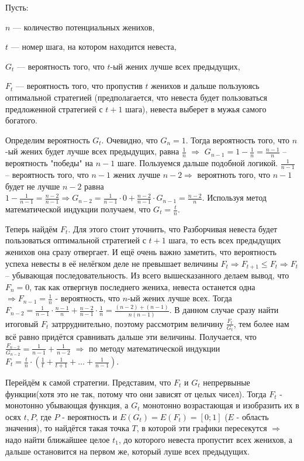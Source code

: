 \documentclass[12pt]{article}
\newcounter{problem}[section]
\newenvironment{problem}%
{%
\refstepcounter{problem}%
     \hypertarget{problem:{\thesection.\theproblem}}{} %
     \Writetofile{solution_file}{\protect\hypertarget{soln:\thesection.\theproblem}{}}
     \begin{myenum}[label=\bfseries\protect\hyperlink{soln:\thesection.\theproblem}{\thesection.\theproblem},ref=\thesection.\theproblem]
     \item%
    }%
    {%
    \end{myenum}}
\begin{document}
\begin{problem}
\begin{sol}
Пусть:

$n$ — количество потенциальных женихов,

$t$ — номер шага, на котором находится невеста,

$G_t$ — вероятность того, что $t$-ый жених лучше всех предыдущих,

$F_t$ — вероятность того, что пропустив $t$ женихов и дальше пользуюясь оптимальной
стратегией (предполагается, что невеста будет пользоваться предложенной стратегией с $t+1$
шага), невеста выберет в мужья самого богатого.

Определим вероятность $G_t$. Очевидно, что $G_n = 1$. Тогда вероятность того, что $n$-ый жених будет лучше всех предыдущих, равна  $\frac{1}{n}$ $\Rightarrow$ $G_{n-1}=1-\frac{1}{n}=\frac{n-1}{n}$ – вероятность "победы" на $n-1$ шаге. Пользуемся дальше подобной логикой. $\frac{1}{n-1}$ – вероятность того, что $n-1$ жених лучше $n-2\Rightarrow$ вероятноть того, что $n-1$ будет не лучше $n-2$ равна $1-\frac{1}{n-1}=\frac{n-2}{n-1}\Rightarrow G_{n-2}= \frac{1}{n-1}\cdot 0+\frac{n-2}{n-1}\cdot G_{n-1}=\frac{n-2}{n}$. Используя метод математической индукции получаем, что $G_t=\frac{t}{n}$.

Теперь найдём $F_t$. Для этого стоит уточнить, что Разборчивая невеста будет пользоваться оптимальной стратегией с $t+1$ шага, то есть всех предыдущих женихов она сразу отвергает. И ещё очень важно заметить, что вероятность успеха невесты в её нелёгком деле не превышает величины $F_t \Rightarrow F_{t+1} \le F_t \Rightarrow F_t$ – убывающая последовательность. Из всего вышесказанного делаем вывод, что $F_n = 0$, так как отвергнув последнего жениха, невеста останется одна $\Rightarrow F_{n-1}=\frac{1}{n}$ - вероятность, что $n$-ый жених лучше всех. Тогда $F_{n-2}=\frac{1}{n-1}\cdot\frac{n-1}{n}+\frac{n-2}{n-1}\cdot\frac{1}{n}=\frac{(n-2)+(n-1)}{n(n-1)}$. В данном случае сразу найти итоговый $F_t$ затрруднительно, поэтому рассмотрим величину $\frac{F_t}{G_t}$, тем более нам всё равно придётся сравнивать дальше эти величины. Получается, что $\frac{F_{n-2}}{G_{n-2}}=\frac{1}{n-1}+\frac{1}{n-2}$ $\Rightarrow$ по методу математической индукции $F_t = \frac{t}{n} \cdot (\frac{1}{t}+\frac{1}{t+1}+\ldots +\frac{1}{n-1})$.

Перейдём к самой стратегии. Представим, что $F_t$ и $G_t$ непрервыные функции(хотя это не так, потому что они зависят от целых чисел). Тогда $F_t$ - монотонно убывающая функция, а $G_t$ монотонно возрастающая и изобразить их в осях $t, P$, где $P$ - вероятность и $E(G_t)=E(F_t)=[0;1]$ ($E$ - область значения), то найдётся такая точка $T$, в которой эти графики пересекутся $\Rightarrow$ надо найти ближайшее целое $t_1$, до которого невеста пропустит всех женихов, а дальше остановится на первом же, который луше всех предыдущих.


\end{sol}
\end{problem}
\end{document}
